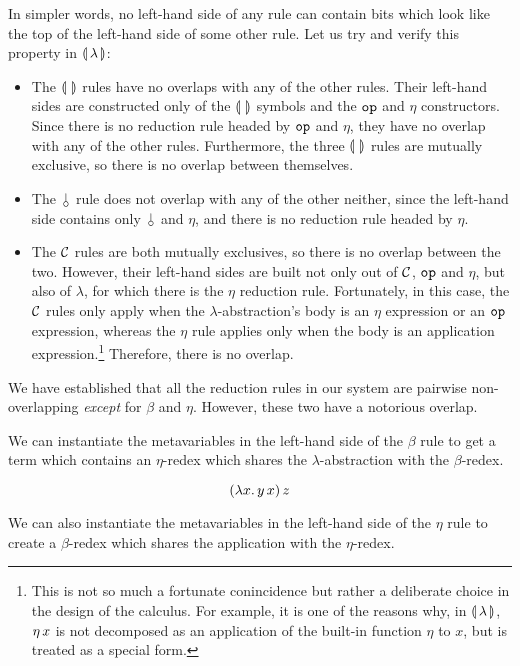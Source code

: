 In simpler words, no left-hand side of any rule can contain bits which look
like the top of the left-hand side of some other rule. Let us try and
verify this property in $\llparenthesis \, \lambda \, \rrparenthesis$:
\begin{itemize}
\item The $\llparenthesis \,  \, \rrparenthesis$ rules have no overlaps with any of the other
  rules. Their left-hand sides are constructed only of the $\llparenthesis \,  \, \rrparenthesis$
  symbols and the $\mathtt{op}$ and $\eta$ constructors. Since there is no
  reduction rule headed by $\mathtt{op}$ and $\eta$, they have no overlap with
  any of the other rules. Furthermore, the three $\llparenthesis \,  \, \rrparenthesis$ rules are
  mutually exclusive, so there is no overlap between themselves.
\item The $\cherry$ rule does not overlap with any of the other neither,
  since the left-hand side contains only $\cherry$ and $\eta$, and there is
  no reduction rule headed by $\eta$.
\item The $\mathcal{C}$ rules are both mutually exclusives, so there is no overlap
  between the two. However, their left-hand sides are built not only out of
  $\mathcal{C}$, $\mathtt{op}$ and $\eta$, but also of $\lambda$, for which there is
  the $\eta$ reduction rule. Fortunately, in this case, the $\mathcal{C}$ rules
  only apply when the $\lambda$-abstraction's body is an $\eta$ expression
  or an $\mathtt{op}$ expression, whereas the $\eta$ rule applies only when the
  body is an application expression.\footnote{This is not so much a
    fortunate conincidence but rather a deliberate choice in the design of
    the calculus. For example, it is one of the reasons why, in ${\llparenthesis \, \lambda \, \rrparenthesis}$,
    $\eta\,x$ is not decomposed as an application of the built-in function
    $\eta$ to $x$, but is treated as a special form.} Therefore, there is
  no overlap.
\end{itemize}

We have established that all the reduction rules in our system are pairwise
non-overlapping \emph{except} for $\beta$ and $\eta$. However,
these two have a notorious overlap.

We can instantiate the metavariables in the left-hand side of the $\beta$
rule to get a term which contains an $\eta$-redex which shares the
$\lambda$-abstraction with the $\beta$-redex.

$$
(\lambda x.\, y\,x)\,z
$$

We can also instantiate the metavariables in the left-hand side of the
$\eta$ rule to create a $\beta$-redex which shares the application with
the $\eta$-redex.

